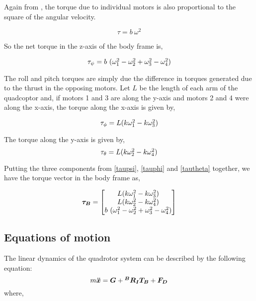 \documentclass[12pt,fleqn]{article}
\newcommand{\mbm}[1]{\mbox{\boldmath $#1$}}
\begin{document}
Again from \cite{Andrew}, the torque due to individual motors is also
proportional to the square of the angular velocity.

$$ \tau = b\ \omega^2 $$

So the net torque in the z-axis of the body frame is,

\begin{equation} \label{taupsi}
$$ \tau_\psi = b\ (\omega_1^2 - \omega_2^2 + \omega_3^2 -
\omega_4^2) $$
\end{equation}

The roll and pitch torques are simply due the difference in torques
generated due to the thrust in the opposing motors. Let $L$ be the
length of each arm of the quadcoptor and, if motors 1 and 3 are along
the y-axis and motors 2 and 4 were along the x-axis, the torque along
the x-axis is given by,

\begin{equation} \label{tauphi}
$$ \tau_\phi = L (k\omega_1^2 - k\omega_3^2) $$
\end{equation}

The torque along the y-axis is given by,
\begin{equation} \label{tautheta}
$$ \tau_\theta = L (k\omega_2^2 - k\omega_4^2) $$
\end{equation}

Putting the three components from \ref{taupsi}, \ref{tauphi} and
\ref{tautheta} together, we have the torque vector in the body frame as,

\begin{equation} \label{tauvector} 
$$ \mbm{\tau_B} = \begin{bmatrix} L (k\omega_1^2 - k\omega_3^2)\\ L
  (k\omega_2^2 - k\omega_4^2) \\ b\ (\omega_1^2 - \omega_2^2 + \omega_3^2 -
\omega_4^2) \end{bmatrix} $$
\end{equation}

\subsection{Equations of motion}

The linear dynamics of the quadrotor system can be described by the
following equation:
\begin{equation} \label{eom_linear}
$$ m \mbm{\ddot{x}} = \mbm{G} + \mbm{^BR_IT_{B}} + \mbm{F_{D}} $$
\end{equation}
where, 
\end{document}

